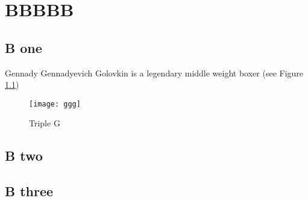 \chapter{BBBBB}\label{ch:B}

\section{B one}
Gennady Gennadyevich Golovkin is a legendary middle weight boxer (see Figure \ref{fig:ggg})

\begin{figure}[h]
    \centering
    \texttt{[image: ggg]}
    \caption{Triple G}
    \label{fig:ggg}
\end{figure}

\section{B two}

\section{B three}